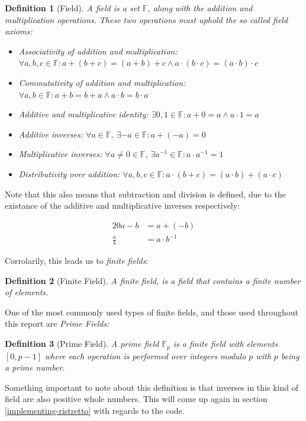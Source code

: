 \documentclass{article}
\newtheorem{definition}{Definition}[section]
\newcommand{\eq}[1]{\begin{alignat*}{20}#1\end{alignat*}}
\newcommand{\F}{\mathbb{F}}
\begin{document}
\begin{definition}[Field]
	A field is a set $\F$, along with the \textit{addition} and
	\textit{multiplication} operations. These two operations must
	uphold the so called \textit{field axioms}:

	\begin{itemize}
		\item Associativity of addition and multiplication:
		$\forall a,b,c \in \F : a + (b + c) = (a + b) + c \land a \cdot (b \cdot c) = (a \cdot b) \cdot c$
		\item Commutativity of addition and multiplication:
		$\forall a,b \in \F : a+b=b+a \land a \cdot b = b \cdot a$
		\item Additive and multiplicative identity:
		$\exists 0,1 \in \F : a + 0 = a \land a \cdot 1 = a$
		\item Additive inverses:
		$\forall a \in \F,\ \exists {-a} \in \F : a + ({-a}) = 0$
		\item Multiplicative inverses:
		$\forall a \neq 0 \in \F,\  \exists a^{-1} \in \F : a \cdot a^{-1} = 1$
		\item Distributivity over addition:
		$\forall a,b,c \in \F : a \cdot (b + c) = (a \cdot b) + (a \cdot c)$
	\end{itemize}
\end{definition}

Note that this also means that subtraction and division is defined,
due to the existance of the additive and multiplicative inverses
respectively:

\eq{
	a-b         &= a + (-b) \\
	\frac{a}{b} &= a \cdot b^{-1}
}

Corrolarily, this leads us to \textit{finite fields}:

\begin{definition}[Finite Field]
	A finite field, is a field that contains a finite number of elements.
\end{definition}

One of the most commonly used types of finite fields, and those used
throughout this report are \textit{Prime Fields:} 

\begin{definition}[Prime Field]
	A prime field $\F_p$ is a finite field with elements $[0,p-1]$
	where each operation is performed over integers modulo $p$ with $p$ being a prime number.
\end{definition}

Something important to note about this definition is that inverses in
this kind of field are also positive whole numbers. This will come up
again in section \ref{implementing-ristretto} with regards to the code.
\end{document}
